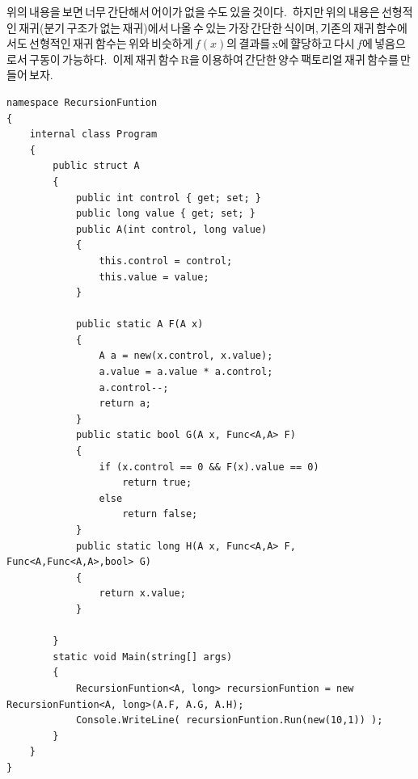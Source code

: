 \documentclass{article}
\begin{document}
위의\,내용을\,보면\,너무\,간단해서\,어이가\,없을\,수도\,있을\,것이다.\,
하지만\,위의\,내용은\,선형적인\,재귀(분기\,구조가\,없는\,재귀)에서\,나올\,수\,있는\,가장\,간단한\,식이며,\,기존의\,재귀\,함수에서도\,선형적인\,재귀\,함수는\,위와\,비슷하게\,$f(x)$의\,결과를\,x에\,햘당하고\,다시\,$f$에\,넣음으로서\,구동이\,가능하다.\,
이제\,재귀\,함수\,R을\,이용하여\,간단한\,양수\,팩토리얼\,재귀\,함수를\,만들어\,보자.
\\
\newline
\begin{lstlisting}[caption={재귀\,함수\,R을\,실제로\,사용하는\,예제}]
namespace RecursionFuntion
{
    internal class Program
    {
        public struct A
        {
            public int control { get; set; }
            public long value { get; set; }
            public A(int control, long value)
            {
                this.control = control;
                this.value = value;
            }

            public static A F(A x)
            {
                A a = new(x.control, x.value);
                a.value = a.value * a.control;
                a.control--;
                return a;
            }
            public static bool G(A x, Func<A,A> F)
            {
                if (x.control == 0 && F(x).value == 0)
                    return true;
                else
                    return false;
            }
            public static long H(A x, Func<A,A> F, Func<A,Func<A,A>,bool> G)
            {
                return x.value;
            }

        }
        static void Main(string[] args)
        {
            RecursionFuntion<A, long> recursionFuntion = new RecursionFuntion<A, long>(A.F, A.G, A.H);
            Console.WriteLine( recursionFuntion.Run(new(10,1)) );
        }
    }
}
\end{lstlisting}
\end{document}
